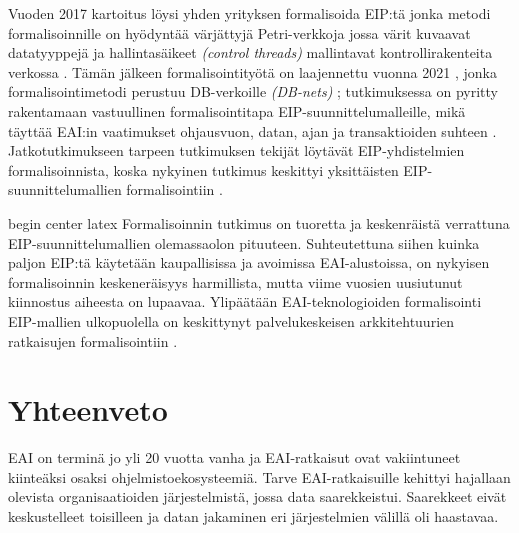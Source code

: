Vuoden 2017 kartoitus \citep{Ritter2017} löysi yhden yrityksen formalisoida EIP:tä \citep{Fahland2013} jonka metodi formalisoinnille on hyödyntää värjättyjä Petri-verkkoja jossa värit kuvaavat datatyyppejä ja hallintasäikeet \textit{(control threads)} mallintavat kontrollirakenteita verkossa \citep{Fahland2013}.
Tämän jälkeen formalisointityötä on laajennettu vuonna 2021 \citep{Ritter2021}, jonka formalisointimetodi perustuu DB-verkoille \textit{(DB-nets)} \citep{Montali2017}; tutkimuksessa on pyritty rakentamaan vastuullinen formalisointitapa EIP-suunnittelumalleille, mikä täyttää EAI:in vaatimukset ohjausvuon, datan, ajan ja transaktioiden suhteen \citep{Ritter2021}. Jatkotutkimukseen tarpeen tutkimuksen tekijät löytävät EIP-yhdistelmien formalisoinnista, koska nykyinen tutkimus keskittyi yksittäisten EIP-suunnittelumallien formalisointiin \citep{Ritter2021}.

begin center latex
Formalisoinnin tutkimus on tuoretta ja keskenräistä verrattuna EIP-suunnittelumallien olemassaolon pituuteen. Suhteutettuna siihen kuinka paljon EIP:tä käytetään kaupallisissa ja avoimissa EAI-alustoissa, on nykyisen formalisoinnin keskeneräisyys harmillista, mutta viime vuosien uusiutunut kiinnostus aiheesta on lupaavaa. Ylipäätään EAI-teknologioiden formalisointi EIP-mallien ulkopuolella on keskittynyt palvelukeskeisen arkkitehtuurien ratkaisujen formalisointiin \citep{Ritter2017}.





\chapter{Yhteenveto}

EAI on terminä jo yli 20 vuotta vanha ja EAI-ratkaisut ovat vakiintuneet kiinteäksi osaksi ohjelmistoekosysteemiä. Tarve EAI-ratkaisuille kehittyi hajallaan olevista organisaatioiden järjestelmistä, jossa data saarekkeistui. Saarekkeet eivät keskustelleet toisilleen ja datan jakaminen eri järjestelmien välillä oli haastavaa.

